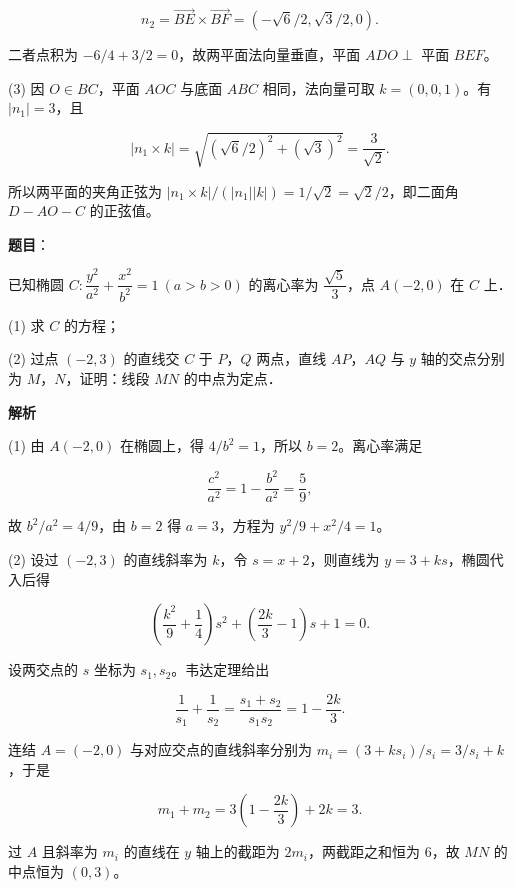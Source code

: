 \begin{answer}
\nopagebreak[4]
\[
n_2=\overrightarrow{BE}\times\overrightarrow{BF}
=(-\sqrt6/2,\sqrt3/2,0).
\]

二者点积为 $-6/4+3/2=0$，故两平面法向量垂直，平面 $ADO\perp$ 平面 $BEF$。


(3) 因 $O\in BC$，平面 $AOC$ 与底面 $ABC$ 相同，法向量可取 $k=(0,0,1)$。有 $|n_1|=3$，且

\nopagebreak[4]
\[
|n_1\times k|=\sqrt{(\sqrt6/2)^2+(\sqrt3)^2}=\frac3{\sqrt2}.
\]

所以两平面的夹角正弦为 $|n_1\times k|/(|n_1||k|)=1/\sqrt2=\sqrt2/2$，即二面角 $D-AO-C$ 的正弦值。




\end{answer}
\begin{answer}

\textbf{题目}：

已知椭圆 $C:\dfrac{y^2}{a^2}+\dfrac{x^2}{b^2}=1\ (a>b>0)$ 的离心率为 $\dfrac{\sqrt5}{3}$，点 $A(-2,0)$ 在 $C$ 上．

(1) 求 $C$ 的方程；

(2) 过点 $(-2,3)$ 的直线交 $C$ 于 $P\text{，}Q$ 两点，直线 $AP\text{，}AQ$ 与 $y$ 轴的交点分别为 $M\text{，}N$，证明：线段 $MN$ 的中点为定点．

\textbf{解析}


(1) 由 $A(-2,0)$ 在椭圆上，得 $4/b^2=1$，所以 $b=2$。离心率满足

\nopagebreak[4]
\[
\frac{c^2}{a^2}=1-\frac{b^2}{a^2}=\frac59,
\]

故 $b^2/a^2=4/9$，由 $b=2$ 得 $a=3$，方程为 $y^2/9+x^2/4=1$。


(2) 设过 $(-2,3)$ 的直线斜率为 $k$，令 $s=x+2$，则直线为 $y=3+ks$，椭圆代入后得

\nopagebreak[4]
\[
\left(\frac{k^2}{9}+\frac14\right)s^2+\left(\frac{2k}{3}-1\right)s+1=0.
\]

设两交点的 $s$ 坐标为 $s_1,s_2$。韦达定理给出

\nopagebreak[4]
\[
\frac1{s_1}+\frac1{s_2}
=\frac{s_1+s_2}{s_1s_2}
=1-\frac{2k}{3}.
\]

连结 $A=(-2,0)$ 与对应交点的直线斜率分别为 $m_i=(3+ks_i)/s_i=3/s_i+k$，于是

\nopagebreak[4]
\[
m_1+m_2=3\left(1-\frac{2k}{3}\right)+2k=3.
\]

过 $A$ 且斜率为 $m_i$ 的直线在 $y$ 轴上的截距为 $2m_i$，两截距之和恒为 $6$，故 $MN$ 的中点恒为 $(0,3)$。



\end{answer}
